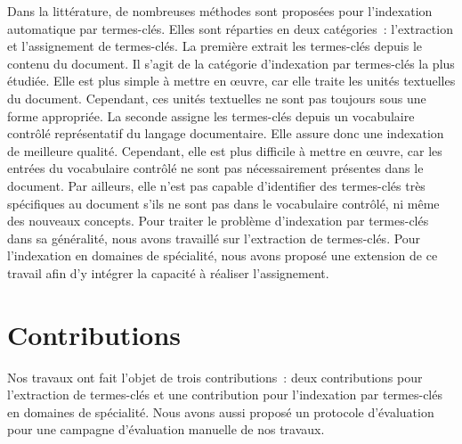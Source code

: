   Dans la littérature, de nombreuses méthodes sont proposées pour l'indexation
  automatique par termes-clés. Elles sont réparties en deux catégories~:
  l'extraction et l'assignement de termes-clés. La première extrait les
  termes-clés depuis le contenu du document. Il s'agit de la catégorie
  d'indexation par termes-clés la plus étudiée. Elle est plus simple à mettre en
  \oe{}uvre, car elle traite les unités textuelles du document. Cependant, ces
  unités textuelles ne sont pas toujours sous une forme appropriée. La seconde
  assigne les termes-clés depuis un vocabulaire contrôlé représentatif du
  langage documentaire. Elle assure donc une indexation de meilleure qualité.
  Cependant, elle est plus difficile à mettre en \oe{}uvre, car les entrées du
  vocabulaire contrôlé ne sont pas nécessairement présentes dans le document.
  Par ailleurs, elle n'est pas capable d'identifier des termes-clés très
  spécifiques au document s'ils ne sont pas dans le vocabulaire contrôlé, ni
  même des nouveaux concepts. Pour traiter le problème d'indexation par
  termes-clés dans sa généralité, nous avons travaillé sur l'extraction de
  termes-clés. Pour l'indexation en domaines de spécialité, nous avons proposé
  une extension de ce travail afin d'y intégrer la capacité à réaliser
  l'assignement.

  \section{Contributions}
  \label{sec:main-conclusion-contributions}
    Nos travaux ont fait l'objet de trois contributions~: deux contributions
    pour l'extraction de termes-clés et une contribution pour l'indexation par
    termes-clés en domaines de spécialité. Nous avons aussi proposé un
    protocole d'évaluation pour une campagne d'évaluation manuelle de nos
    travaux.

